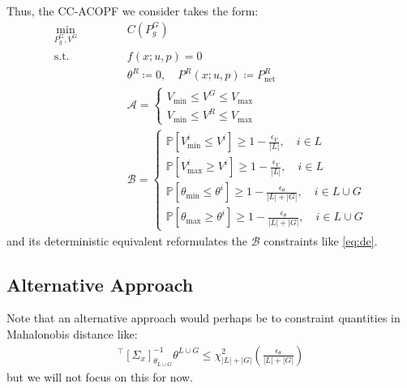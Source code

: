 Thus, the CC-ACOPF we consider takes the form:
\begin{subequations}
	\label{eq:cc-acopf}
	\begin{alignat}{3}
	\underset{P_g^G, V^G}{\min} & \quad && C(P_g^G) \\
	\text{s.t.} && \quad & f\left(x; u, p \right) = 0 \\
	&&& \theta^R \coloneqq 0, \quad P^R (x; u, p) \coloneqq P_{\text{net}}^R \\
	&&& \mathcal{A} =
	\begin{cases}
	V_{\min} \leq V^G \leq V_{\max} \\
	V_{\min} \leq V^R \leq V_{\max}
	\end{cases}\\
	&&& \mathcal{B} =
	\begin{cases}
	\mathbb{P} \left[ V_{\min}^i \leq V^{i} \right]  \geq 1 - \frac{\epsilon_V}{|L|}, \quad i \in L\\
	\mathbb{P} \left[ V_{\max}^i \geq V^{i} \right]  \geq 1 - \frac{\epsilon_V}{|L|}, \quad i \in L\\
	\mathbb{P} \left[ \theta_{\min} \leq \theta^{i} \right] \geq 1 - \frac{\epsilon_{\theta}}{|L|+|G|}, \quad i \in L \cup G \\
	\mathbb{P} \left[ \theta_{\max} \geq \theta^{i} \right] \geq 1 - \frac{\epsilon_{\theta}}{|L|+|G|}, \quad i \in L \cup G
	\end{cases}
	\end{alignat}
\end{subequations}
and its deterministic equivalent reformulates the $\mathcal{B}$ constraints like \cref{eq:de}.

\subsection*{Alternative Approach}
Note that an alternative approach would perhaps be to constraint quantities in Mahalonobis distance like:
\begin{align}
[\theta^{L \cup G}]^{\top} [\Sigma_x]_{\theta_{L\cup G}}^{-1} \theta^{L \cup G} \leq \chi^2_{{|L|+|G|}}\left( \frac{\epsilon_{\theta}}{|L|+|G|} \right)
\end{align}
but we will not focus on this for now.